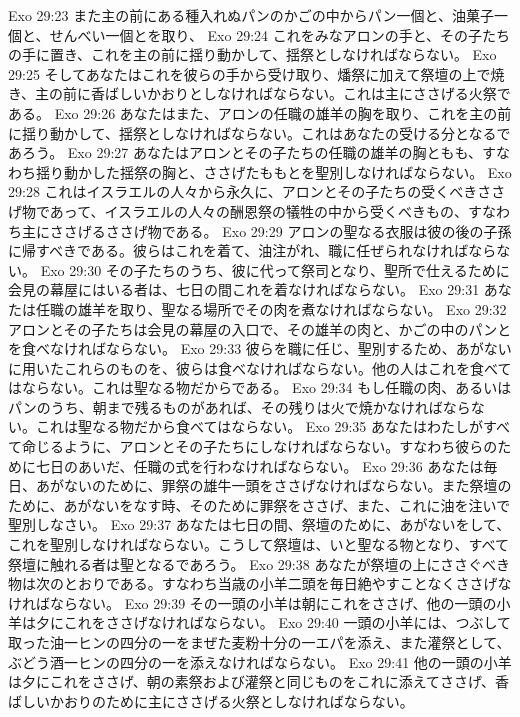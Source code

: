 Exo 29:23  また主の前にある種入れぬパンのかごの中からパン一個と、油菓子一個と、せんべい一個とを取り、
Exo 29:24  これをみなアロンの手と、その子たちの手に置き、これを主の前に揺り動かして、揺祭としなければならない。
Exo 29:25  そしてあなたはこれを彼らの手から受け取り、燔祭に加えて祭壇の上で焼き、主の前に香ばしいかおりとしなければならない。これは主にささげる火祭である。
Exo 29:26  あなたはまた、アロンの任職の雄羊の胸を取り、これを主の前に揺り動かして、揺祭としなければならない。これはあなたの受ける分となるであろう。
Exo 29:27  あなたはアロンとその子たちの任職の雄羊の胸ともも、すなわち揺り動かした揺祭の胸と、ささげたももとを聖別しなければならない。
Exo 29:28  これはイスラエルの人々から永久に、アロンとその子たちの受くべきささげ物であって、イスラエルの人々の酬恩祭の犠牲の中から受くべきもの、すなわち主にささげるささげ物である。
Exo 29:29  アロンの聖なる衣服は彼の後の子孫に帰すべきである。彼らはこれを着て、油注がれ、職に任ぜられなければならない。
Exo 29:30  その子たちのうち、彼に代って祭司となり、聖所で仕えるために会見の幕屋にはいる者は、七日の間これを着なければならない。
Exo 29:31  あなたは任職の雄羊を取り、聖なる場所でその肉を煮なければならない。
Exo 29:32  アロンとその子たちは会見の幕屋の入口で、その雄羊の肉と、かごの中のパンとを食べなければならない。
Exo 29:33  彼らを職に任じ、聖別するため、あがないに用いたこれらのものを、彼らは食べなければならない。他の人はこれを食べてはならない。これは聖なる物だからである。
Exo 29:34  もし任職の肉、あるいはパンのうち、朝まで残るものがあれば、その残りは火で焼かなければならない。これは聖なる物だから食べてはならない。
Exo 29:35  あなたはわたしがすべて命じるように、アロンとその子たちにしなければならない。すなわち彼らのために七日のあいだ、任職の式を行わなければならない。
Exo 29:36  あなたは毎日、あがないのために、罪祭の雄牛一頭をささげなければならない。また祭壇のために、あがないをなす時、そのために罪祭をささげ、また、これに油を注いで聖別しなさい。
Exo 29:37  あなたは七日の間、祭壇のために、あがないをして、これを聖別しなければならない。こうして祭壇は、いと聖なる物となり、すべて祭壇に触れる者は聖となるであろう。
Exo 29:38  あなたが祭壇の上にささぐべき物は次のとおりである。すなわち当歳の小羊二頭を毎日絶やすことなくささげなければならない。
Exo 29:39  その一頭の小羊は朝にこれをささげ、他の一頭の小羊は夕にこれをささげなければならない。
Exo 29:40  一頭の小羊には、つぶして取った油一ヒンの四分の一をまぜた麦粉十分の一エパを添え、また灌祭として、ぶどう酒一ヒンの四分の一を添えなければならない。
Exo 29:41  他の一頭の小羊は夕にこれをささげ、朝の素祭および灌祭と同じものをこれに添えてささげ、香ばしいかおりのために主にささげる火祭としなければならない。
